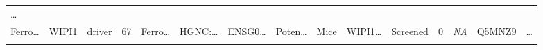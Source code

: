 \documentclass[
]{article}
\begin{document}
\begin{longtable}[]{@{}lllllllllllllll@{}}
\begin{minipage}[t]{0.02\columnwidth}
\ldots{}\strut
\end{minipage}\tabularnewline
\begin{minipage}[t]{0.05\columnwidth}\raggedright
Ferro\ldots{}\strut
\end{minipage} & \begin{minipage}[t]{0.05\columnwidth}\raggedright
WIPI1\strut
\end{minipage} & \begin{minipage}[t]{0.04\columnwidth}\raggedright
driver\strut
\end{minipage} & \begin{minipage}[t]{0.02\columnwidth}\raggedright
67\strut
\end{minipage} & \begin{minipage}[t]{0.05\columnwidth}\raggedright
Ferro\ldots{}\strut
\end{minipage} & \begin{minipage}[t]{0.05\columnwidth}\raggedright
HGNC:\ldots{}\strut
\end{minipage} & \begin{minipage}[t]{0.05\columnwidth}\raggedright
ENSG0\ldots{}\strut
\end{minipage} & \begin{minipage}[t]{0.05\columnwidth}\raggedright
Poten\ldots{}\strut
\end{minipage} & \begin{minipage}[t]{0.05\columnwidth}\raggedright
Mice\strut
\end{minipage} & \begin{minipage}[t]{0.05\columnwidth}\raggedright
WIPI1\ldots{}\strut
\end{minipage} & \begin{minipage}[t]{0.05\columnwidth}\raggedright
Screened\strut
\end{minipage} & \begin{minipage}[t]{0.05\columnwidth}\raggedright
0\strut
\end{minipage} & \begin{minipage}[t]{0.05\columnwidth}\raggedright
\emph{NA}\strut
\end{minipage} & \begin{minipage}[t]{0.05\columnwidth}\raggedright
Q5MNZ9\strut
\end{minipage} & \begin{minipage}[t]{0.02\columnwidth}\raggedright
\ldots{}\strut
\end{minipage}\tabularnewline
\begin{minipage}[t]{0.05\columnwidth}\raggedright

\end{minipage}
\end{longtable}
\end{document}
